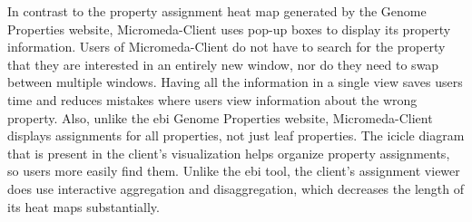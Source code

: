 In contrast to the property assignment heat map generated by the Genome 
Properties website, Micromeda-Client uses pop-up boxes to display its property 
information. Users of Micromeda-Client do not have to search for the property 
that they are interested in an entirely new window, nor do they need to swap 
between multiple windows. Having all the information in a single view saves 
users time and reduces mistakes where users view information about the wrong 
property. Also, unlike the \gls{ebi} Genome Properties website, Micromeda-Client 
displays assignments for all properties, not just leaf properties. The icicle 
diagram that is present in the client's visualization helps organize property 
assignments, so users more easily find them. Unlike the \gls{ebi} tool, the 
client's assignment viewer does use interactive aggregation and disaggregation, 
which decreases the length of its heat maps substantially.

